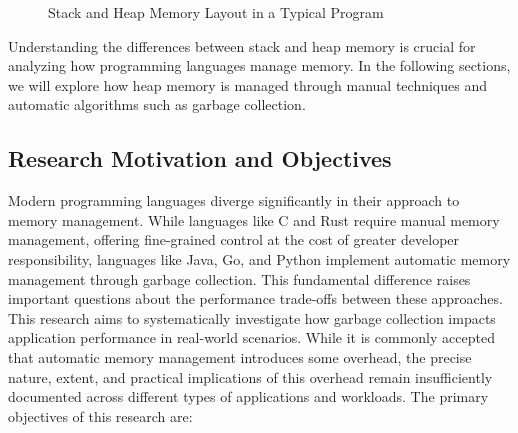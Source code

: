 \documentclass{article}
\begin{document}
\begin{figure}[h]
\centering
{}
\caption{Stack and Heap Memory Layout in a Typical Program }
\end{figure}

Understanding the differences between stack and heap memory is crucial for analyzing how programming languages manage memory. In the following sections, we will explore how heap memory is managed through manual techniques and automatic algorithms such as garbage collection.

\subsection{Research Motivation and Objectives}

Modern programming languages diverge significantly in their approach to memory management. While languages like C and Rust require manual memory management, offering fine-grained control at the cost of greater developer responsibility, languages like Java, Go, and Python implement automatic memory management through garbage collection. This fundamental difference raises important questions about the performance trade-offs between these approaches. This research aims to systematically investigate how garbage collection impacts application performance in real-world scenarios. While it is commonly accepted that automatic memory management introduces some overhead, the precise nature, extent, and practical implications of this overhead remain insufficiently documented across different types of applications and workloads. The primary objectives of this research are:
\end{document}
